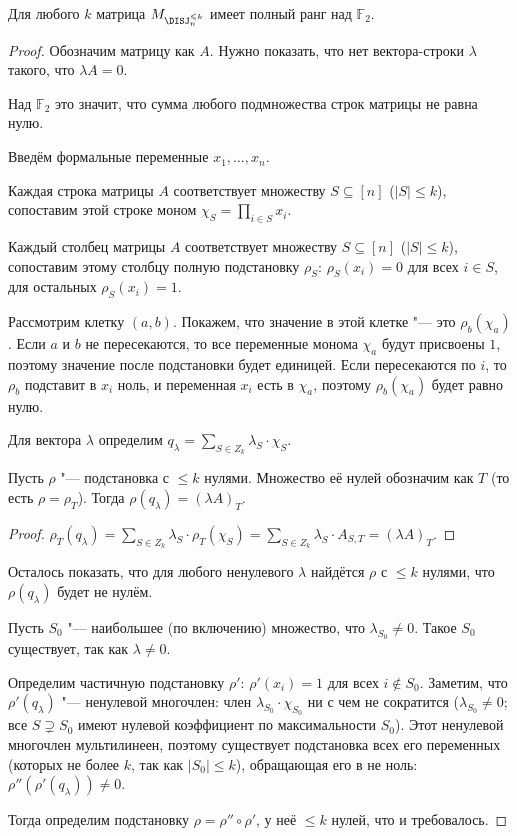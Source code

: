 \begin{theorem}[Разборов]
Для любого $k$ матрица $M_{\DISJ^{\leqslant k}_n}$ имеет полный ранг над $\mathbb{F}_2$.
\end{theorem}
\begin{proof}
Обозначим матрицу как $A$.
Нужно показать, что нет вектора-строки $\lambda$ такого, что $\lambda A = 0$.

Над $\mathbb{F}_2$ это значит, что сумма любого подмножества строк матрицы не равна нулю.

Введём формальные переменные $x_1, \ldots, x_n$.

Каждая строка матрицы $A$ соответствует множеству $S\subseteq [n]$ ($|S|\leqslant k$), сопоставим этой строке моном $\chi_S = \prod_{i\in S} x_i$.

Каждый столбец матрицы $A$ соответствует множеству $S\subseteq [n]$ ($|S|\leqslant k$), сопоставим этому столбцу полную подстановку $\rho_S$: $\rho_S(x_i) = 0$ для всех $i\in S$, для остальных $\rho_S(x_i) = 1$.

Рассмотрим клетку $(a, b)$. Покажем, что значение в этой клетке "--- это $\rho_b(\chi_a)$.
Если $a$ и $b$ не пересекаются, то все переменные монома $\chi_a$ будут присвоены $1$, поэтому значение после подстановки будет единицей.
Если пересекаются по $i$, то $\rho_b$ подставит в $x_i$ ноль, и переменная $x_i$ есть в $\chi_a$, поэтому $\rho_b(\chi_a)$ будет равно нулю.

Для вектора $\lambda$ определим $q_{\lambda} = \sum_{S\in Z_k} \lambda_S\cdot \chi_S$.

\begin{claim}
Пусть $\rho$ "--- подстановка с $\leqslant k$ нулями.
Множество её нулей обозначим как $T$ (то есть $\rho = \rho_T$).
Тогда $\rho(q_\lambda) = (\lambda A)_T$.
\end{claim}
\begin{proof}
$\rho_T(q_\lambda) = \sum_{S\in Z_k} \lambda_S\cdot \rho_T(\chi_S) = \sum_{S\in Z_k} \lambda_S\cdot A_{S, T} = (\lambda A)_T$.
\end{proof}

Осталось показать, что для любого ненулевого $\lambda$ найдётся $\rho$ с $\leqslant k$ нулями, что $\rho(q_\lambda)$ будет не нулём.

Пусть $S_0$ "--- наибольшее (по включению) множество, что $\lambda_{S_0} \neq 0$. Такое $S_0$ существует, так как $\lambda\neq 0$.

Определим частичную подстановку $\rho'$: $\rho'(x_i) = 1$ для всех $i\not\in S_0$.
Заметим, что $\rho'(q_\lambda)$ "--- ненулевой многочлен: член $\lambda_{S_0}\cdot \chi_{S_0}$ ни с чем не сократится ($\lambda_{S_0}\neq 0$; все $S\supsetneq S_0$ имеют нулевой коэффициент по максимальности $S_0$). Этот ненулевой многочлен мультилинеен, поэтому существует подстановка всех его переменных (которых не более $k$, так как $|S_0|\leqslant k$), обращающая его в не ноль: $\rho''(\rho'(q_\lambda)) \neq 0$.

Тогда определим подстановку $\rho = \rho''\circ \rho'$, у неё $\leqslant k$ нулей, что и требовалось.
\end{proof}


